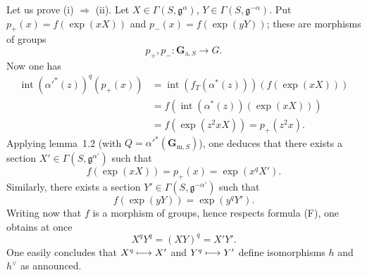 Let us prove (i) $\Rightarrow$ (ii). Let $X\in\Gamma(S,\mathfrak g^\alpha)$, $Y\in\Gamma(S,\mathfrak g^{-\alpha})$. Put $p_+(x)=f(\exp(xX))$ and $p_-(x)=f(\exp(yY))$; these are morphisms of groups
\[
p_+,p_-:\mathbf G_{\mathrm a,S}\to G.
\]
Now one has
\[
\begin{aligned}
\operatorname{int}(\alpha'^*(z))^q(p_+(x))&=\operatorname{int}(f_T(\alpha^*(z)))(f(\exp(xX)))\\
&=f(\operatorname{int}(\alpha^*(z))(\exp(xX)))\\
&=f(\exp(z^2xX))=p_+(z^2x).
\end{aligned}
\]
Applying lemma~1.2 (with $Q=\alpha'^*(\mathbf G_{\mathrm m,S})$), one deduces that there exists a section $X'\in\Gamma(S,\mathfrak g^{\alpha'})$ such that
\[
f(\exp(xX))=p_+(x)=\exp(x^qX').
\]
Similarly, there exists a section $Y'\in\Gamma(S,\mathfrak g^{-\alpha'})$ such that
\[
f(\exp(yY))=\exp(y^qY').
\]
Writing now that $f$ is a morphism of groups, hence respects formula (F), one obtains at once
\[
X^qY^q=(XY)^q=X'Y'.
\]
One easily concludes that $X^q\longmapsto X'$ and $Y^q\longmapsto Y'$ define isomorphisms $h$ and $h^\vee$ as announced.

